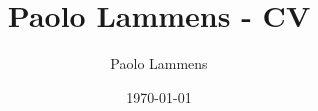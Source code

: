 \documentclass[a4paper, 11pt]{article}
\title{Paolo Lammens - CV}
\author{Paolo Lammens}
\date{\today}
\begin{document}
\makeatletter

\newcommand{\ifnn}[2]{\ifthenelse{\equal{#1}{}}{}{#2}}
\newcommand{\showlink}[2][https]{\href{#1://#2}{#2}}

\newcommand{\rendercvemail}{\href{mailto:\cvemail}{\cvemail}}
\newcommand{\rendercvphone}{\textcolor{myorange}{\cvphone}}
\newcommand{\rendercvlinkedin}{\showlink{linkedin.com/in/\cvlinkedin/}}
\newcommand{\rendercvgithub}{\showlink{github.com/\cvgithub}}

\newcommand{\cvsectiontitle}[1]{
    \rule{5mm}{0.5mm}\vspace{2mm}
    \section*{\Large\bfseries #1}
}

\newcommand{\cvsectionrule}{\rule{\columnwidth}{0.5mm}\vspace*{5pt}}

\newcommand{\cvchronoitem}[6]{
    {\raggedright\textbf{\ignorespaces#1}\ifnn{#2}{ -- #2}\par}%
    {\textcolor{myorange}{\small\uppercase{\ignorespaces#3 \ifnn{#4}{-- #4} \ifnn{#5}{$\,|\,$ #5}}}%
     \medskip\par}%
    {\setstretch{0.9}\small #6 \par}%
}

\newcommand{\cvlanguages}{}
\newcommand{\addcvlanguage}[2]{
    \g@addto@macro\cvlanguages{\\ #1 \noexpand& #2}
}

\setlength{\tabulinesep}{5pt}
\setlength{\tabcolsep}{10pt}
\thispagestyle{empty}

\setlength{\intextsep}{0.1mm}

\makeatother




\newcommand{\cvaboutme}{}



\end{document}
